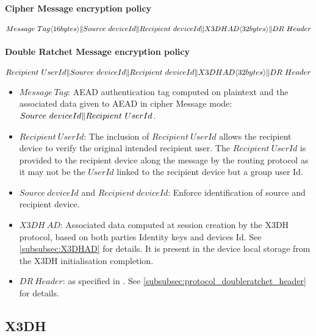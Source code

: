 \documentclass[a4paper,11pt]{article}
\begin{document}
     \paragraph*{Cipher Message encryption policy}
     \begin{algorithmic}
          \State $Message\ Tag\langle 16bytes\rangle \Arrowvert Source\ deviceId \Arrowvert Recipient\ deviceId \Arrowvert X3DH AD\langle 32bytes\rangle \Arrowvert DR\ Header$
     \end{algorithmic}
     \paragraph*{Double Ratchet Message encryption policy}
     \begin{algorithmic}
          \State $Recipient\ UserId \Arrowvert Source\ deviceId \Arrowvert Recipient\ deviceId \Arrowvert X3DH AD\langle 32bytes\rangle \Arrowvert DR\ Header$
     \end{algorithmic}

     \begin{itemize}
      \item $Message\ Tag$: AEAD authentication tag computed on plaintext and the associated data given to AEAD in cipher Message mode: $Source\ deviceId\Arrowvert Recipient\ UserId$.
      \item $Recipient\ UserId$: The inclusion of $Recipient\ UserId$ allows the recipient device to verify the original intended recipient user. The $Recipient\ UserId$ is provided to the recipient device along the message by the routing protocol as it may not be the $UserId$ linked to the recipient device but a group user Id.
      \item $Source\ deviceId$ and $Recipient\ deviceId$: Enforce identification of source and recipient device.
      \item $X3DH\ AD$: Associated data computed at session creation by the X3DH protocol, based on both parties Identity keys and devices Id. See \ref{subsubsec:X3DHAD} for details. It is present in the device local storage from the X3DH initialisation completion.
      \item $DR\ Header$: as specified in \cite[section 3.4]{doubleRatchet}. See \ref{subsubsec:protocol_doubleratchet_header} for details.
     \end{itemize}


  \subsection{X3DH}
\end{document}

